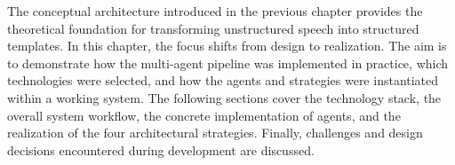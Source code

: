 The conceptual architecture introduced in the previous chapter provides the theoretical foundation for transforming unstructured speech into structured templates. In this chapter, the focus shifts from design to realization. The aim is to demonstrate how the multi-agent pipeline was implemented in practice, which technologies were selected, and how the agents and strategies were instantiated within a working system. The following sections cover the technology stack, the overall system workflow, the concrete implementation of agents, and the realization of the four architectural strategies. Finally, challenges and design decisions encountered during development are discussed.






